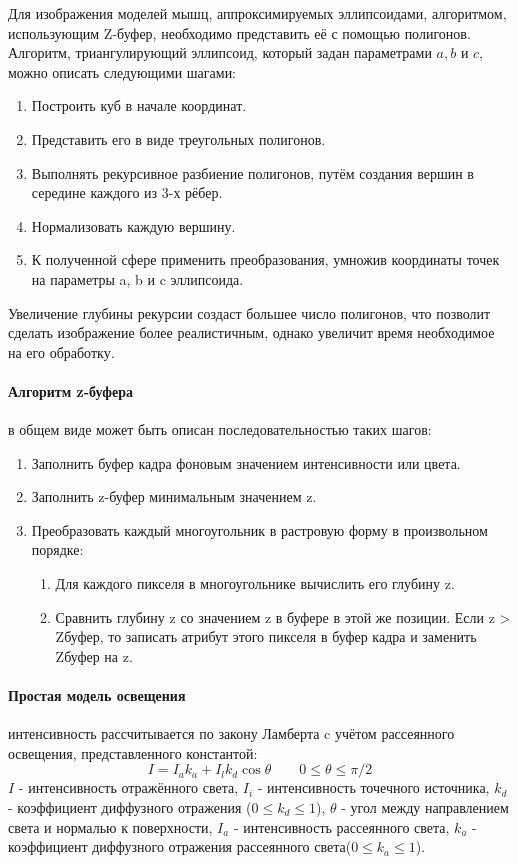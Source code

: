 \par Для изображения моделей мышц, аппроксимируемых эллипсоидами, алгоритмом, использующим Z-буфер, необходимо представить её с помощью полигонов. Алгоритм, триангулирующий эллипсоид, который задан параметрами $a, b$ и $c$, можно описать следующими шагами:
\begin{enumerate}[1.]
	\item Построить куб в начале координат.
	\item Представить его в виде треугольных полигонов.
	\item Выполнять рекурсивное разбиение полигонов, путём создания вершин в середине каждого из 3-х рёбер.
	\item Нормализовать каждую вершину.
	\item К полученной сфере применить преобразования, умножив координаты точек на параметры a, b и c эллипсоида.
\end{enumerate}
\par Увеличение глубины рекурсии создаст большее число полигонов, что позволит сделать изображение более реалистичным, однако увеличит время необходимое на его обработку.

\paragraph{Алгоритм z-буфера}
в общем виде может быть описан последовательностью таких шагов:
\begin{enumerate}[1.]
	\item Заполнить буфер кадра фоновым значением интенсивности или цвета.
	\item Заполнить z-буфер минимальным значением z.
	\item Преобразовать каждый многоугольник в растровую форму в произвольном порядке:
	\begin{enumerate}
		\item Для каждого пикселя в многоугольнике вычислить его глубину z.
		\item Сравнить глубину z со значением z в буфере в этой же позиции. Если z > Zбуфер, то записать атрибут этого пикселя в буфер кадра и заменить Zбуфер на z.
	\end{enumerate}
\end{enumerate}

\paragraph{Простая модель освещения} интенсивность рассчитывается по закону Ламберта c учётом рассеянного освещения, представленного константой:
\begin{equation}\label{lambert2}
I = I_{a}k_{a} + I_{l}k_{d}\cos \theta \qquad 0\leq\theta\leq\pi/2
\end{equation}
$I$ - интенсивность отражённого света, $I_{i}$ - интенсивность точечного источника, $k_{d}$ - коэффициент диффузного отражения ($0\leq k_{d}\leq 1$), $\theta$ - угол между направлением света и нормалью к поверхности, $I_{a}$ - интенсивность рассеянного света, $k_{a}$ - коэффициент диффузного отражения рассеянного света($0\leq k_{a}\leq 1$).

